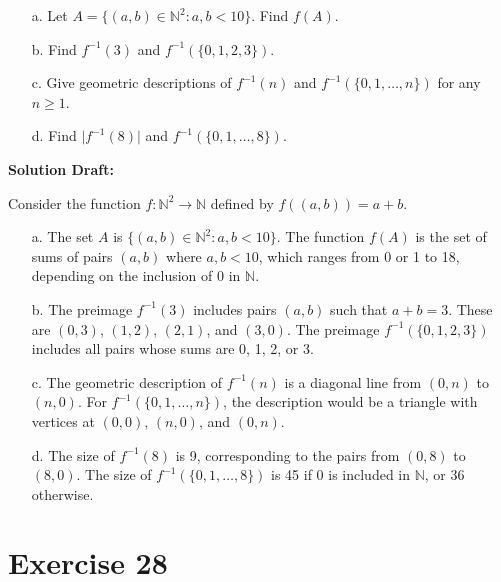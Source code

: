 \documentclass{article}
\begin{document}
\begin{enumerate}
    \item[a.] Let \( A = \{(a, b) \in \mathbb{N}^2 : a, b < 10\} \). Find \( f(A) \).

    \item[b.] Find \( f^{-1}(3) \) and \( f^{-1}(\{0, 1, 2, 3\}) \).

    \item[c.] Give geometric descriptions of \( f^{-1}(n) \) and \( f^{-1}(\{0, 1, \ldots, n\}) \) for any \( n \geq 1 \).

    \item[d.] Find \( \lvert f^{-1}(8) \rvert \) and \( f^{-1}(\{0, 1, \ldots, 8\}) \).
\end{enumerate}

\noindent\textbf{Solution Draft:} 

Consider the function \( f: \mathbb{N}^2 \rightarrow \mathbb{N} \) defined by \( f((a, b)) = a + b \).
\begin{enumerate}

\item[a.]
The set \( A \) is \( \{(a, b) \in \mathbb{N}^2 : a, b < 10\} \). The function \( f(A) \) is the set of sums of pairs \( (a, b) \) where \( a, b < 10 \), which ranges from 0 or 1 to 18, depending on the inclusion of 0 in \( \mathbb{N} \).

\item[b.]
The preimage \( f^{-1}(3) \) includes pairs \( (a, b) \) such that \( a + b = 3 \). These are \( (0, 3) \), \( (1, 2) \), \( (2, 1) \), and \( (3, 0) \). The preimage \( f^{-1}(\{0, 1, 2, 3\}) \) includes all pairs whose sums are 0, 1, 2, or 3.

\item[c.]
The geometric description of \( f^{-1}(n) \) is a diagonal line from \( (0, n) \) to \( (n, 0) \). For \( f^{-1}(\{0, 1, \ldots, n\}) \), the description would be a triangle with vertices at \( (0, 0) \), \( (n, 0) \), and \( (0, n) \).

\item[d.]
The size of \( f^{-1}(8) \) is 9, corresponding to the pairs from \( (0, 8) \) to \( (8, 0) \). The size of \( f^{-1}(\{0, 1, \ldots, 8\}) \) is 45 if 0 is included in \( \mathbb{N} \), or 36 otherwise.
\end{enumerate}

\section*{Exercise 28}  
\end{document}
